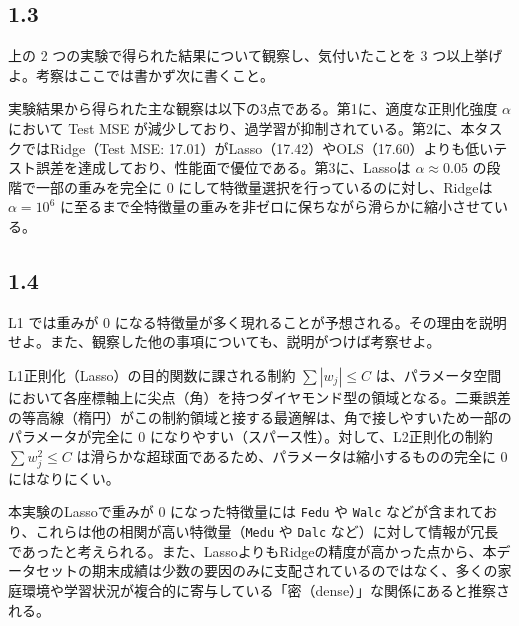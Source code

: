 \documentclass[11pt,a4paper,dvipdfmx]{article}
\numberwithin{equation}{section}
\newenvironment{note}[0]
{
    \begin{tcolorbox}[sharp corners, colframe=gray!20, colback=gray!20, width=\textwidth]
}
{
    \end{tcolorbox}
}
\begin{document}
\subsection*{1.3}
\begin{note}
上の 2 つの実験で得られた結果について観察し、気付いたことを 3 つ以上挙げよ。考察はここでは書かず次に書くこと。
\end{note}
\begin{proofbox}
実験結果から得られた主な観察は以下の3点である。第1に、適度な正則化強度 $\alpha$ において Test MSE が減少しており、過学習が抑制されている。第2に、本タスクではRidge（Test MSE: 17.01）がLasso（17.42）やOLS（17.60）よりも低いテスト誤差を達成しており、性能面で優位である。第3に、Lassoは $\alpha \approx 0.05$ の段階で一部の重みを完全に 0 にして特徴量選択を行っているのに対し、Ridgeは $\alpha = 10^6$ に至るまで全特徴量の重みを非ゼロに保ちながら滑らかに縮小させている。
\end{proofbox}

\subsection*{1.4}
\begin{note}
L1 では重みが 0 になる特徴量が多く現れることが予想される。その理由を説明せよ。また、観察した他の事項についても、説明がつけば考察せよ。
\end{note}
\begin{proofbox}
L1正則化（Lasso）の目的関数に課される制約 $\sum |w_j| \le C$ は、パラメータ空間において各座標軸上に尖点（角）を持つダイヤモンド型の領域となる。二乗誤差の等高線（楕円）がこの制約領域と接する最適解は、角で接しやすいため一部のパラメータが完全に 0 になりやすい（スパース性）。対して、L2正則化の制約 $\sum w_j^2 \le C$ は滑らかな超球面であるため、パラメータは縮小するものの完全に 0 にはなりにくい。

本実験のLassoで重みが 0 になった特徴量には \texttt{Fedu} や \texttt{Walc} などが含まれており、これらは他の相関が高い特徴量（\texttt{Medu} や \texttt{Dalc} など）に対して情報が冗長であったと考えられる。また、LassoよりもRidgeの精度が高かった点から、本データセットの期末成績は少数の要因のみに支配されているのではなく、多くの家庭環境や学習状況が複合的に寄与している「密（dense）」な関係にあると推察される。
\end{proofbox}
\end{document}

